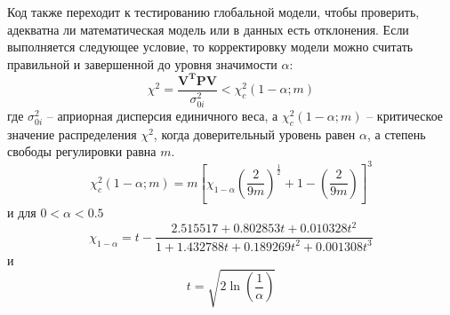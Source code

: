 Код также переходит к тестированию глобальной модели, чтобы проверить, адекватна
ли математическая модель или в данных есть отклонения. Если выполняется
следующее условие, то корректировку модели можно считать правильной и
завершенной до уровня значимости $\alpha$:
\begin{equation}
    \chi^2=\frac{\mathbf{V}^{\mathbf{T}}\mathbf{P}\mathbf{V}}{\sigma^2_{0i}}<\chi^2_c\left(1-\alpha;m\right)
\end{equation}
где $\sigma^2_{0i}$ -- априорная дисперсия единичного веса, а
$\chi^2_c\left(1-\alpha;m\right)$ -- критическое значение распределения
$\chi^2$, когда доверительный уровень равен $\alpha$, а степень свободы регулировки
равна $m$.
\begin{equation}
    \chi^2_c\left(1-\alpha;m\right)=m\left[\chi_{1-\alpha}\left(\frac{2}{9m}\right)^{\frac{1}{2}}+1-\left(\frac{2}{9m}\right)\right]^3
\end{equation}
и для $0<\alpha<0.5$
\begin{equation}
    \chi_{1-\alpha} = t - \frac{2.515517 + 0.802853t + 0.010328t^2}{1 + 1.432788t + 0.189269t^2 + 0.001308t^3}
\end{equation}
и
\begin{equation}
    t = \sqrt{2\ln \left(\frac{1}{\alpha}\right)}
\end{equation}
